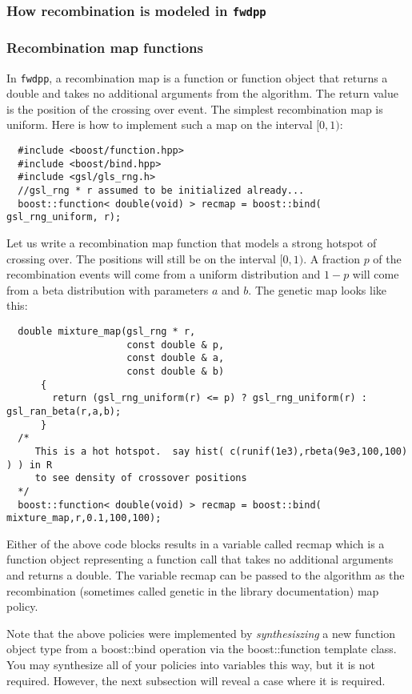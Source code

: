 \documentclass{article}
\begin{document}
\subsubsection{\label{recmodel}How recombination is modeled in \texttt{fwdpp}}
\subsubsection{Recombination map functions}
In \texttt{fwdpp}, a recombination map is a function or function object that returns a double and takes no additional arguments from the algorithm.  The return value is the position of the crossing over event.  The simplest recombination map is uniform.  Here is how to implement such a map on the interval $[0,1)$:

\begin{lstlisting}
  #include <boost/function.hpp>
  #include <boost/bind.hpp>
  #include <gsl/gls_rng.h>
  //gsl_rng * r assumed to be initialized already...
  boost::function< double(void) > recmap = boost::bind( gsl_rng_uniform, r);
\end{lstlisting}

Let us write a recombination map function that models a strong hotspot of crossing over.  The positions will still be on the interval $[0,1)$.  A fraction $p$ of the recombination events will come from a uniform distribution and $1-p$ will come from a beta distribution with parameters $a$ and $b$.  The genetic map looks like this:
\begin{lstlisting}
  double mixture_map(gsl_rng * r, 
                     const double & p,
                     const double & a,
                     const double & b)
      {
        return (gsl_rng_uniform(r) <= p) ? gsl_rng_uniform(r) : gsl_ran_beta(r,a,b);
      }
  /*
     This is a hot hotspot.  say hist( c(runif(1e3),rbeta(9e3,100,100) ) ) in R 
     to see density of crossover positions
  */
  boost::function< double(void) > recmap = boost::bind( mixture_map,r,0.1,100,100);
\end{lstlisting}

Either of the above code blocks results in a variable called recmap which is a function object representing a function call that takes no additional arguments and returns a double.  The variable recmap can be passed to the algorithm as the recombination (sometimes called genetic in the library documentation) map policy.

Note that the above policies were implemented by \textit{synthesiszing} a new function object type from a boost::bind operation via the boost::function template class.  You may synthesize all of your policies into variables this way, but it is not required.  However, the next subsection will reveal a case where it is required.
\end{document}
